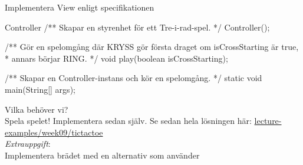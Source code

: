 \documentclass{lecturenotes}
\begin{document}
\begin{Slide}{Implementera View enligt specifikationen}
\begin{ClassSpec}{Controller}
/** Skapar en styrenhet för ett Tre-i-rad-spel. */
Controller(); 

/** Gör en spelomgång där KRYSS gör första draget om isCrossStarting är true,
*   annars börjar RING. */
void play(boolean isCrossStarting);

/** Skapar en Controller-instans och kör en spelomgång. */
static void main(String[] args);
\end{ClassSpec}
\vspace{2em}
\footnotesize Vilka  behöver vi?  \\
\vspace{1em}
Spela spelet! Implementera sedan själv. Se sedan hela lösningen här:
\href{https://github.com/bjornregnell/lth-eda016-2015/tree/master/lectures/examples/eclipse-ws/lecture-examples/src/week09/tictactoe}{lecture-examples/week09/tictactoe} \\
\vspace{1em}
\textit{Extrauppgift}: \\Implementera brädet med en alternativ  som använder 
\end{Slide}
\end{document}
